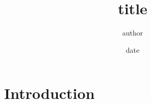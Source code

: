 \documentclass{ec}
\begin{document}
\title{title}
\author{author}
\date{date}

\maketitle
\thesis{}
\tableofcontents

\section{Introduction}
\end{document}
